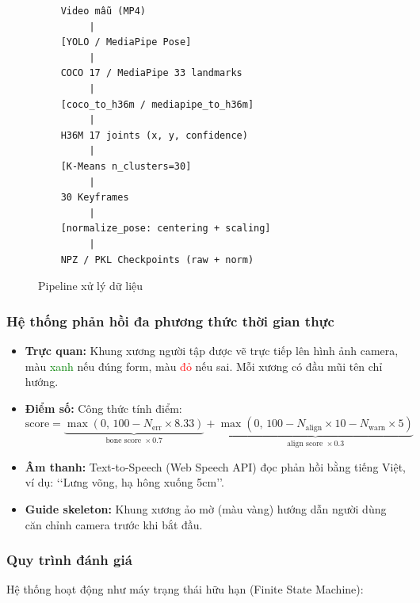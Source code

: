 \documentclass[a4paper,12pt]{article}
\begin{document}
\begin{figure}[H]
    \centering
    \begin{minipage}{0.9\textwidth}
    \begin{verbatim}
    Video mẫu (MP4)
         |
    [YOLO / MediaPipe Pose]
         |
    COCO 17 / MediaPipe 33 landmarks
         |
    [coco_to_h36m / mediapipe_to_h36m]
         |
    H36M 17 joints (x, y, confidence)
         |
    [K-Means n_clusters=30]
         |
    30 Keyframes
         |
    [normalize_pose: centering + scaling]
         |
    NPZ / PKL Checkpoints (raw + norm)
    \end{verbatim}
    \end{minipage}
    \caption{Pipeline xử lý dữ liệu}
    \label{fig:pipeline}
\end{figure}

\subsubsection{Hệ thống phản hồi đa phương thức thời gian thực}
\begin{itemize}
    \item \textbf{Trực quan:} Khung xương người tập được vẽ trực tiếp lên hình ảnh camera, màu \textcolor{green}{xanh} nếu đúng form, màu \textcolor{red}{đỏ} nếu sai. Mỗi xương có đầu mũi tên chỉ hướng.
    \item \textbf{Điểm số:} Công thức tính điểm:
    \begin{equation}
        \text{score} = \underbrace{\max(0,\,100 - N_{\text{err}} \times 8.33)}_{\text{bone score } \times 0.7} + \underbrace{\max(0,\,100 - N_{\text{align}} \times 10 - N_{\text{warn}} \times 5)}_{\text{align score } \times 0.3}
    \end{equation}
    \item \textbf{Âm thanh:} Text-to-Speech (Web Speech API) đọc phản hồi bằng tiếng Việt, ví dụ: \lq\lq Lưng võng, hạ hông xuống 5cm\rq\rq.
    \item \textbf{Guide skeleton:} Khung xương ảo mờ (màu vàng) hướng dẫn người dùng căn chỉnh camera trước khi bắt đầu.
\end{itemize}

\subsubsection{Quy trình đánh giá}
Hệ thống hoạt động như máy trạng thái hữu hạn (Finite State Machine):
\end{document}
